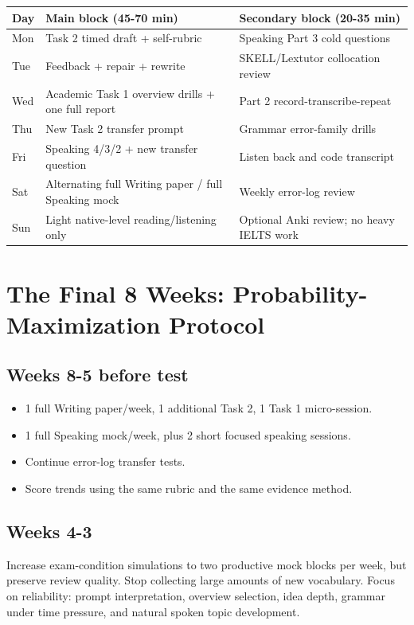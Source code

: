 \documentclass[11pt,a4paper]{article}
\begin{document}
\begin{table}[H]
\centering
\begin{tabularx}{\textwidth}{p{1.6cm}X X}
\toprule
Day & Main block (45-70 min) & Secondary block (20-35 min) \\
\midrule
Mon & Task 2 timed draft + self-rubric & Speaking Part 3 cold questions \\
Tue & Feedback + repair + rewrite & SKELL/Lextutor collocation review \\
Wed & Academic Task 1 overview drills + one full report & Part 2 record-transcribe-repeat \\
Thu & New Task 2 transfer prompt & Grammar error-family drills \\
Fri & Speaking 4/3/2 + new transfer question & Listen back and code transcript \\
Sat & Alternating full Writing paper / full Speaking mock & Weekly error-log review \\
Sun & Light native-level reading/listening only & Optional Anki review; no heavy IELTS work \\
\bottomrule
\end{tabularx}
\end{table}

\section{The Final 8 Weeks: Probability-Maximization Protocol}

\subsection{Weeks 8-5 before test}
\begin{itemize}
\item 1 full Writing paper/week, 1 additional Task 2, 1 Task 1 micro-session.
\item 1 full Speaking mock/week, plus 2 short focused speaking sessions.
\item Continue error-log transfer tests.
\item Score trends using the same rubric and the same evidence method.
\end{itemize}

\subsection{Weeks 4-3}
Increase exam-condition simulations to two productive mock blocks per week, but preserve review quality. Stop collecting large amounts of new vocabulary. Focus on reliability: prompt interpretation, overview selection, idea depth, grammar under time pressure, and natural spoken topic development.
\end{document}
